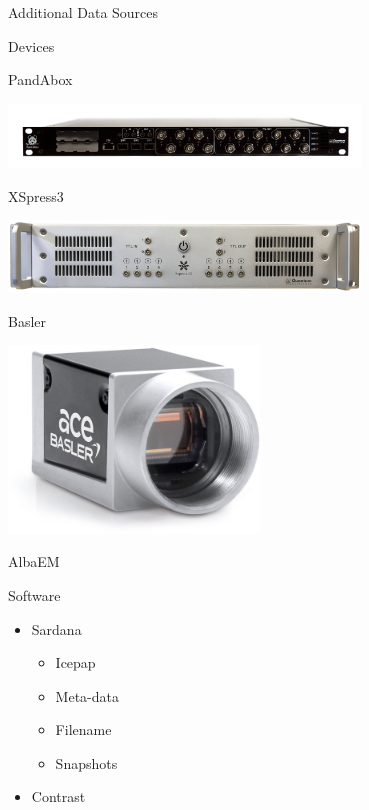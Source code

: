 \documentclass[aspectratio=169]{beamer}
\begin{document}
\begin{frame}{Additional Data Sources}

\begin{minipage}[t]{0.5\textwidth}
  \begin{block}{Devices}
  \centering

  PandAbox

   \includegraphics[width=0.7\textwidth]{dets/panda}


   XSpress3

   \includegraphics[width=0.7\textwidth]{dets/xspress}

   Basler

   \includegraphics[width=0.5\textwidth]{dets/basler}

  AlbaEM
  \end{block}

\end{minipage}
\begin{minipage}[t]{0.49\textwidth}
\begin{block}{Software}
 \begin{itemize}
  \item Sardana
  \begin{itemize}
   \item Icepap
   \item Meta-data
   \item Filename
   \item Snapshots
  \end{itemize}

  \item Contrast
 \end{itemize}
 \end{block}
\end{minipage}

\end{frame}
\end{document}
